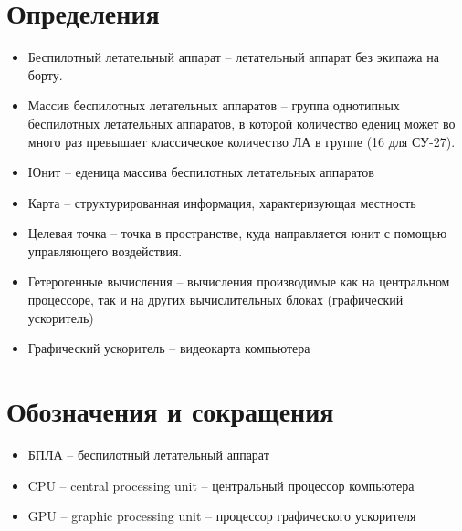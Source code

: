 \newpage
\section{Определения}

\begin{itemize}
\item Беспилотный летательный аппарат -- летательный
      аппарат без экипажа \lb на борту.

\item Массив беспилотных летательных аппаратов -- группа
      однотипных беспилотных летательных аппаратов, в которой
      количество едениц может во много раз превышает
      классическое количество ЛА в группе (16 для СУ-27).

\item Юнит -- еденица массива беспилотных летательных аппаратов

\item Карта -- структурированная информация, характеризующая местность

\item Целевая точка -- точка в пространстве, куда направляется юнит с 
    помощью управляющего воздействия.

\item Гетерогенные вычисления -- вычисления производимые
      как на центральном процессоре, так и на других
      вычислительных блоках (графический ускоритель)

\item Графический ускоритель -- видеокарта компьютера

\end{itemize}

\newpage
\section{Обозначения и сокращения}

\begin{itemize}

\item БПЛА -- беспилотный летательный аппарат

\item CPU -- central processing unit -- центральный процессор компьютера

\item GPU -- graphic processing unit -- процессор графического ускорителя

\end{itemize}
